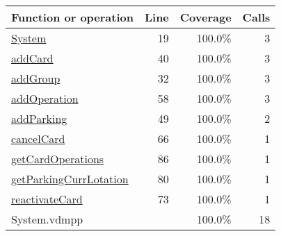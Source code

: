 \bigskip
\begin{longtable}{|l|r|r|r|}
\hline
Function or operation & Line & Coverage & Calls \\
\hline
\hline
\hyperref[System:19]{System} & 19&100.0\% & 3 \\
\hline
\hyperref[addCard:40]{addCard} & 40&100.0\% & 3 \\
\hline
\hyperref[addGroup:32]{addGroup} & 32&100.0\% & 3 \\
\hline
\hyperref[addOperation:58]{addOperation} & 58&100.0\% & 3 \\
\hline
\hyperref[addParking:49]{addParking} & 49&100.0\% & 2 \\
\hline
\hyperref[cancelCard:66]{cancelCard} & 66&100.0\% & 1 \\
\hline
\hyperref[getCardOperations:86]{getCardOperations} & 86&100.0\% & 1 \\
\hline
\hyperref[getParkingCurrLotation:80]{getParkingCurrLotation} & 80&100.0\% & 1 \\
\hline
\hyperref[reactivateCard:73]{reactivateCard} & 73&100.0\% & 1 \\
\hline
\hline
System.vdmpp & & 100.0\% & 18 \\
\hline
\end{longtable}

